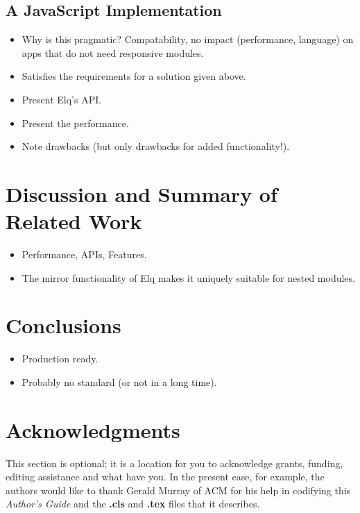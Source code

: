 \documentclass{acm_proc_article-sp}
\begin{document}
  \subsection{A JavaScript Implementation}
    \begin{itemize}
      \item Why is this pragmatic? Compatability, no impact (performance, language) on apps that do not need responsive modules.
      \item Satisfies the requirements for a solution given above.
      \item Present Elq's API.
      \item Present the performance.
      \item Note drawbacks (but only drawbacks for added functionality!).
    \end{itemize}

\section{Discussion and Summary of Related Work}
  \begin{itemize}
    \item Performance, APIs, Features.
    \item The mirror functionality of Elq makes it uniquely suitable for nested modules.
  \end{itemize}

\section{Conclusions}
  \begin{itemize}
    \item Production ready.
    \item Probably no standard (or not in a long time).
  \end{itemize}


\section{Acknowledgments}
This section is optional; it is a location for you
to acknowledge grants, funding, editing assistance and
what have you.  In the present case, for example, the
authors would like to thank Gerald Murray of ACM for
his help in codifying this \textit{Author's Guide}
and the \textbf{.cls} and \textbf{.tex} files that it describes.

%

%
%
\end{document}
